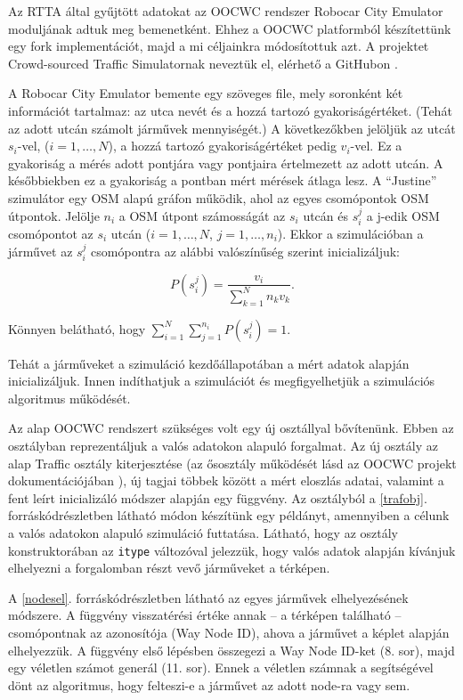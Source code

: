 \documentclass[a4paper,12pt]{report}
\begin{document}
Az RTTA által gyűjtött adatokat az OOCWC rendszer Robocar City Emulator moduljának adtuk meg bemenetként. Ehhez a OOCWC platformból készítettünk egy fork implementációt, majd a mi céljainkra módosítottuk azt. A projektet Crowd-sourced Traffic Simulatornak neveztük el, elérhető a GitHubon \cite{csts}.

A Robocar City Emulator bemente egy szöveges file, mely soronként két információt tartalmaz: az utca nevét és a hozzá tartozó gyakoriságértéket. (Tehát az adott utcán számolt járművek mennyiségét.) A következőkben jelöljük az utcát $s_i$-vel, ($i=1, \dots, N$), a hozzá tartozó gyakoriságértéket pedig $v_i$-vel. Ez a gyakoriság a mérés adott pontjára vagy pontjaira értelmezett az adott utcán. A későbbiekben ez a gyakoriság a pontban mért mérések átlaga lesz. A ``Justine'' szimulátor egy OSM alapú gráfon működik, ahol az egyes csomópontok OSM útpontok. Jelölje $n_i$ a OSM útpont számosságát az $s_i$ utcán és $s_i^j$ a j-edik OSM csomópontot az $s_i$ utcán ($i=1, \dots, N$, $j=1, \dots, n_i$). Ekkor a szimulációban a járművet az $s_i^j$ csomópontra az alábbi valószínűség szerint inicializáljuk: 

\[P(s_i^j)=\frac{v_i}{\sum_{k=1}^{N}{n_kv_k}}.\]

Könnyen belátható, hogy $\sum_{i=1}^{N}\sum_{j=1}^{n_i}P(s_i^j) = 1$.

Tehát a járműveket a szimuláció kezdőállapotában a mért adatok alapján inicializáljuk. Innen indíthatjuk a szimulációt és megfigyelhetjük a szimulációs algoritmus működését.

Az alap OOCWC rendszert szükséges volt egy új osztállyal bővítenünk. Ebben az osztályban reprezentáljuk a valós adatokon alapuló forgalmat. Az új osztály az alap Traffic osztály kiterjesztése (az ősosztály működését lásd az OOCWC projekt dokumentációjában \cite{oocwcrepo}), új tagjai többek között a mért eloszlás adatai, valamint a fent leírt inicializáló módszer alapján egy függvény. Az osztályból a \ref{trafobj}. forráskódrészletben látható módon készítünk egy példányt, amennyiben a célunk a valós adatokon alapuló szimuláció futtatása. Látható, hogy az osztály konstruktorában az \texttt{itype} változóval jelezzük, hogy valós adatok alapján kívánjuk elhelyezni a forgalomban részt vevő járműveket a térképen.



A \ref{nodesel}. forráskódrészletben látható az egyes járművek elhelyezésének módszere. A függvény visszatérési értéke annak -- a térképen található -- csomópontnak az azonosítója (Way Node ID), ahova a járművet a képlet alapján elhelyezzük. A függvény első lépésben összegezi a Way Node ID-ket (8. sor), majd egy véletlen számot generál (11. sor). Ennek a véletlen számnak a segítségével dönt az algoritmus, hogy felteszi-e a járművet az adott node-ra vagy sem.
\end{document}
